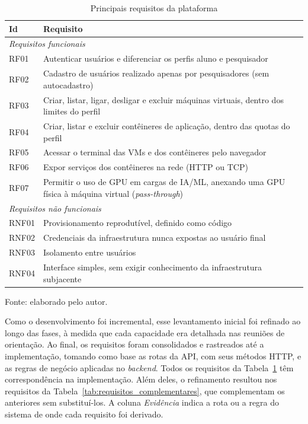 \begin{table}[htb]
    \centering
    \caption{Principais requisitos da plataforma}
    \label{tab:requisitos}
    \begin{tabularx}{\textwidth}{|l|X|}
        \hline
        \textbf{Id} & \textbf{Requisito} \\ \hline
        \multicolumn{2}{|l|}{\textit{Requisitos funcionais}} \\ \hline
        RF01 & Autenticar usuários e diferenciar os perfis aluno e pesquisador \\ \hline
        RF02 & Cadastro de usuários realizado apenas por pesquisadores (sem autocadastro) \\ \hline
        RF03 & Criar, listar, ligar, desligar e excluir máquinas virtuais, dentro dos limites do perfil \\ \hline
        RF04 & Criar, listar e excluir contêineres de aplicação, dentro das quotas do perfil \\ \hline
        RF05 & Acessar o terminal das VMs e dos contêineres pelo navegador \\ \hline
        RF06 & Expor serviços dos contêineres na rede (HTTP ou TCP) \\ \hline
        RF07 & Permitir o uso de GPU em cargas de IA/ML, anexando uma GPU física à máquina virtual (\textit{pass-through}) \\ \hline
        \multicolumn{2}{|l|}{\textit{Requisitos não funcionais}} \\ \hline
        RNF01 & Provisionamento reprodutível, definido como código \\ \hline
        RNF02 & Credenciais da infraestrutura nunca expostas ao usuário final \\ \hline
        RNF03 & Isolamento entre usuários \\ \hline
        RNF04 & Interface simples, sem exigir conhecimento da infraestrutura subjacente \\ \hline
    \end{tabularx}
    \par\small Fonte: elaborado pelo autor.
\end{table}

\par Como o desenvolvimento foi incremental, esse levantamento inicial foi refinado ao longo das fases, à medida que cada capacidade era detalhada nas reuniões de orientação. Ao final, os requisitos foram consolidados e rastreados até a implementação, tomando como base as rotas da API, com seus métodos HTTP, e as regras de negócio aplicadas no \textit{backend}. Todos os requisitos da Tabela~\ref{tab:requisitos} têm correspondência na implementação. Além deles, o refinamento resultou nos requisitos da Tabela~\ref{tab:requisitos_complementares}, que complementam os anteriores sem substituí-los. A coluna \textit{Evidência} indica a rota ou a regra do sistema de onde cada requisito foi derivado.

